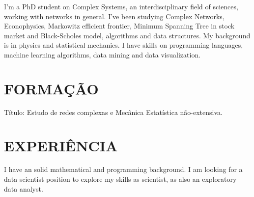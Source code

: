 \documentclass[12pt,a4paper,roman]{moderncv}        %
\begin{document}
\makecvtitle

\small{I'm a PhD student on Complex Systems, an interdisciplinary field of sciences, working with networks in general. I've been studying Complex Networks, Econophysics, Markowitz efficient frontier, Minimum Spanning Tree in stock market and Black-Scholes model, algorithms and data structures. My background is in physics and statistical mechanics. I have skills on programming languages, machine learning algorithms, data mining and data visualization.}

\section{FORMAÇÃO}

\vspace{5pt}


\vspace{5pt}

Título: \textsf{Estudo de redes complexas e Mecânica Estatística não-extensiva}.  %

\vspace{5pt}


\section{EXPERIÊNCIA}

\vspace{5pt}
I have an solid mathematical and programming background. I am looking for a data scientist position to explore my skills as scientist, as also an exploratory data analyst. 

\vspace{5pt}

\end{document}
